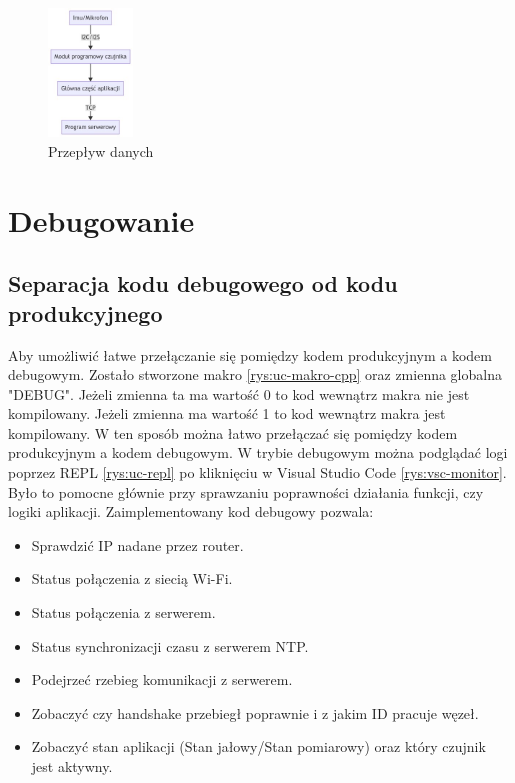 \documentclass[12pt,oneside,a4paper]{book}
\theoremstyle{break}
\begin{document}
\begin{figure}[H]
    \begin{center}
        \includegraphics[width=0.2\textwidth]{uc-data-flow}
        \caption{Przepływ danych}
        \label{rys:uc-data-flow}
    \end{center}
\end{figure}

\section{Debugowanie}
\subsection{Separacja kodu debugowego od kodu produkcyjnego}

Aby umożliwić łatwe przełączanie się pomiędzy kodem produkcyjnym a kodem debugowym. Zostało
stworzone makro \ref{rys:uc-makro-cpp} oraz zmienna globalna "DEBUG". Jeżeli zmienna ta ma wartość
0 to kod wewnątrz makra nie jest kompilowany. Jeżeli zmienna ma wartość 1 to kod wewnątrz makra
jest kompilowany. W ten sposób można łatwo przełączać się pomiędzy kodem produkcyjnym a kodem
debugowym. W trybie debugowym można podglądać logi poprzez REPL \ref{rys:uc-repl} po kliknięciu w Visual Studio Code
\ref{rys:vsc-monitor}. Było to pomocne głównie przy sprawzaniu poprawności działania funkcji,
czy logiki aplikacji. Zaimplementowany kod debugowy pozwala:

\begin{itemize}
    \item Sprawdzić IP nadane przez router.
    \item Status połączenia z siecią Wi-Fi.
    \item Status połączenia z serwerem.
    \item Status synchronizacji czasu z serwerem NTP.
    \item Podejrzeć rzebieg komunikacji z serwerem.
    \item Zobaczyć czy handshake przebiegł poprawnie i z jakim ID pracuje węzeł.
    \item Zobaczyć stan aplikacji (Stan jałowy/Stan pomiarowy) oraz który czujnik jest aktywny.
\end{itemize}
\end{document}
